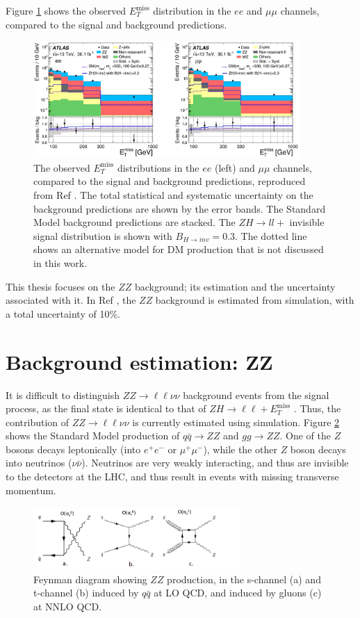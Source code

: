\documentclass[11pt,a4paper,openright,twoside]{report}
\newcommand{\ZZ}{$ZZ\to \ell\ell\nu\nu$ }
\newcommand{\met}{$E_T^{\mathrm{miss}}$ }
\begin{document}
Figure \ref{fig:ZH_results} shows the observed \met distribution in the $ee$ and $\mu\mu$ channels, compared to the signal and background predictions.
\begin{figure}[h]
\centering
		\includegraphics[width=0.9\textwidth]{ZH_results.png}
		\caption{The observed \met distributions in the $ee$ (left) and $\mu\mu$ channels, compared to the signal and background predictions, reproduced from Ref \cite{ZH_ATLAS}. The total statistical and systematic uncertainty on the background predictions are shown by the error bands. The Standard Model background predictions are stacked. The $ZH\to ll+$ invisible signal distribution is shown with $B_{H\to inv}=0.3$. The dotted line shows an alternative model for DM production that is not discussed in this work.}
		\label{fig:ZH_results}
\end{figure}

This thesis focuses on the $ZZ$ background; its estimation and the uncertainty associated with it. In Ref \cite{ZH_ATLAS}, the $ZZ$ background is estimated from simulation, with a total uncertainty of 10\%.



\section{Background estimation: ZZ}
It is difficult to distinguish \ZZ background events from the signal process, as the final state is identical to that of $ZH\to \ell\ell+$\met. Thus, the contribution of \ZZ is currently estimated using simulation. Figure \ref{fig:ZZ} shows the Standard Model production of $q\bar{q}\to ZZ$ and $gg\to ZZ$. One of the $Z$ bosons decays leptonically (into $e^+e^-$ or $\mu^+\mu^-$), while the other $Z$ boson decays into neutrinos ($\nu\bar{\nu}$). Neutrinos are very weakly interacting, and thus are invisible to the detectors at the LHC, and thus result in events with missing transverse momentum.

\begin{figure}[H]
\centering
		\includegraphics[width=0.7\textwidth]{ZZ.png}
		\caption{Feynman diagram showing $ZZ$ production, in the s-channel (a) and t-channel (b) induced by $q\bar{q}$ at LO QCD, and induced by gluons (c) at NNLO QCD.}
		\label{fig:ZZ}
\end{figure}
\end{document}
